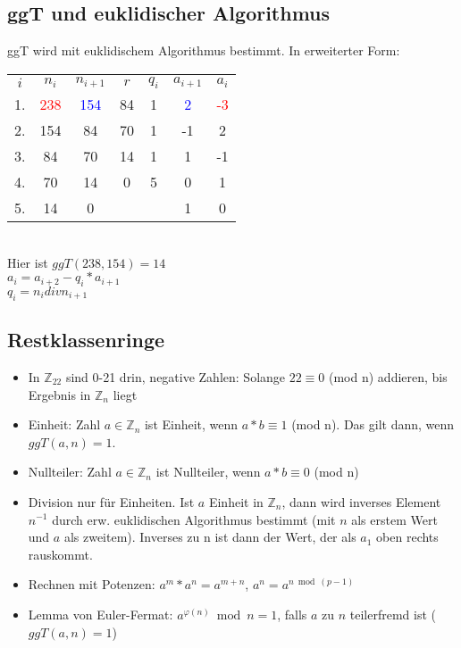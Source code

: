 \documentclass[12pt,landscape]{article}
\begin{document}
\begin{multicols}{3}
\begin{itemize}
\end{itemize}
\subsection{ggT und euklidischer Algorithmus}
ggT wird mit euklidischem Algorithmus bestimmt. In erweiterter Form:\\
\begin{tabular}{ccccccc}
$i$ & $n_i$ & $n_{i+1}$ &  $r$ & $q_i$ & $a_{i+1}$ & $a{_i}$ \\ 
1. & \textcolor{red}{238} & \textcolor{blue}{154} & 84 & 1 & \textcolor{blue}{2} & \textcolor{red}{-3} \\ 
2. & 154 &  84 & 70 & 1 & -1 & 2 \\ 
3. & 84 & 70 & 14 & 1 & 1 & -1 \\ 
4. & 70 & 14 & 0 & 5 & 0 & 1 \\ 
5. & 14 & 0 & &  & 1 & 0 \\ 
\end{tabular}\\
Hier ist $ggT(238, 154) = 14$\\
$a_i = a_{i+2} - q_i * a_{i+1}$\\
$q_i = n_i div n_{i+1}$\\
\subsection{Restklassenringe}
\begin{itemize}
\item In $\mathbb{Z}_{22}$ sind 0-21 drin, negative Zahlen: Solange $22 \equiv 0$ (mod n) addieren, bis Ergebnis in $\mathbb{Z}_{n}$ liegt
\item Einheit: Zahl $a \in \mathbb{Z}_{n}$ ist Einheit, wenn $a * b \equiv 1$ (mod n). Das gilt dann, wenn $ggT(a, n) = 1$.
\item Nullteiler: Zahl $a \in \mathbb{Z}_{n}$ ist Nullteiler, wenn $a * b \equiv 0$ (mod n)
\item Division nur für Einheiten. Ist $a$ Einheit in $\mathbb{Z}_{n}$, dann wird inverses Element $n^{-1}$ durch erw. euklidischen Algorithmus bestimmt (mit $n$ als erstem Wert und $a$ als zweitem). Inverses zu n ist dann der Wert, der als $a_1$ oben rechts rauskommt.
\item Rechnen mit Potenzen: $a^m * a^n = a^{m+n}$, $a^n=a^{n \bmod (p-1)}$ 
\item Lemma von Euler-Fermat: $a^{\varphi(n)} \bmod n = 1$, falls $a$ zu $n$ teilerfremd ist ($ggT(a, n)=1$)
\end{itemize}

\end{multicols}
\end{document}
